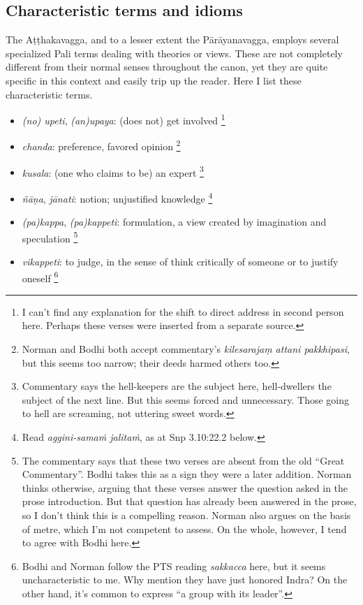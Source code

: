 \documentclass[12pt,openany]{book}%
\begin{document}
\subsection*{Characteristic terms and idioms}

The \textsanskrit{Aṭṭhakavagga}, and to a lesser extent the \textsanskrit{Pārāyanavagga}, employs several specialized Pali terms dealing with theories or views. These are not completely different from their normal senses throughout the canon, yet they are quite specific in this context and easily trip up the reader. Here I list these characteristic terms.

\begin{itemize}%
\item \textit{(no) upeti}, \textit{(an)upaya}: (does not) get involved \footnote{I can’t find any explanation for the shift to direct address in second person here. Perhaps these verses were inserted from a separate source. }%
\item \textit{chanda}: preference, favored opinion \footnote{Norman and Bodhi both accept commentary’s \textit{kilesarajaṃ attani pakkhipasi}, but this seems too narrow; their deeds harmed others too. }%
\item \textit{kusala}: (one who claims to be) an expert \footnote{Commentary says the hell-keepers are the subject here, hell-dwellers the subject of the next line. But this seems forced and unnecessary. Those going to hell are screaming, not uttering sweet words. }%
\item \textit{\textsanskrit{ñāṇa}}, \textit{\textsanskrit{jānati}}: notion; unjustified knowledge \footnote{Read \textit{aggini-\textsanskrit{samaṁ} \textsanskrit{jalitaṁ}}, as at Snp 3.10:22.2 below. }%
\item \textit{(pa)kappa}, \textit{(pa)kappeti}: formulation, a view created by imagination and speculation \footnote{The commentary says that these two verses are absent from the old “Great Commentary”. Bodhi takes this as a sign they were a later addition. Norman thinks otherwise, arguing that these verses answer the question asked in the prose introduction. But that question has already been answered in the prose, so I don’t think this is a compelling reason. Norman also argues on the basis of metre, which I’m not competent to assess. On the whole, however, I tend to agree with Bodhi here. }%
\item \textit{vikappeti}: to judge, in the sense of think critically of someone or to justify oneself \footnote{Bodhi and Norman follow the PTS reading \textit{sakkacca} here, but it seems uncharacteristic to me. Why mention they have just honored Indra? On the other hand, it’s common to express “a group with its leader”. }%

\end{itemize}
\end{document}
